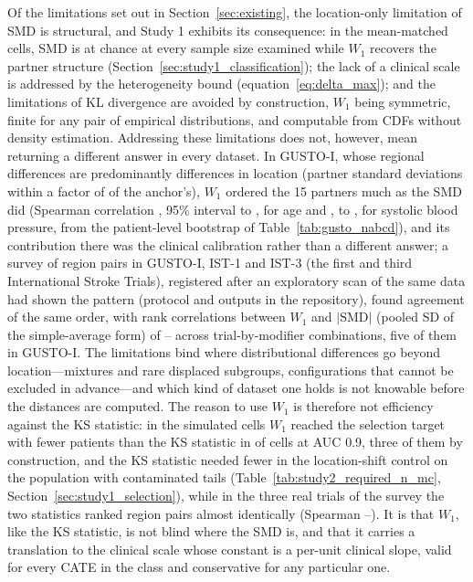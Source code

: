 \documentclass[AMA,Times1COL]{WileyNJDv5}
\begin{document}
Of the limitations set out in Section~\ref{sec:existing}, the location-only limitation of SMD is structural, and Study 1 exhibits its consequence: in the mean-matched cells, SMD is at chance at every sample size examined while $W_1$ recovers the partner structure (Section~\ref{sec:study1_classification}); the lack of a clinical scale is addressed by the heterogeneity bound (equation~\ref{eq:delta_max}); and the limitations of KL divergence are avoided by construction, $W_1$ being symmetric, finite for any pair of empirical distributions, and computable from CDFs without density estimation. Addressing these limitations does not, however, mean returning a different answer in every dataset. In GUSTO-I, whose regional differences are predominantly differences in location (partner standard deviations within a factor of  of the anchor's), $W_1$ ordered the 15 partners much as the SMD did (Spearman correlation , 95\% interval  to , for age and ,  to , for systolic blood pressure, from the patient-level bootstrap of Table~\ref{tab:gusto_nabcd}), and its contribution there was the clinical calibration rather than a different answer; a survey of  region pairs in GUSTO-I, IST-1 and IST-3 (the first and third International Stroke Trials),\cite{gusto1993,ist1_2000,ist3_2012} registered after an exploratory scan of the same data had shown the pattern (protocol and outputs in the repository), found agreement of the same order, with rank correlations between $W_1$ and $|\mathrm{SMD}|$ (pooled SD of the simple-average form) of -- across  trial-by-modifier combinations, five of them in GUSTO-I. The limitations bind where distributional differences go beyond location---mixtures and rare displaced subgroups, configurations that cannot be excluded in advance---and which kind of dataset one holds is not knowable before the distances are computed. The reason to use $W_1$ is therefore not efficiency against the KS statistic: in the simulated cells $W_1$ reached the selection target with fewer patients than the KS statistic in  of  cells at AUC 0.9, three of them by construction, and the KS statistic needed fewer in the location-shift control on the population with contaminated tails (Table~\ref{tab:study2_required_n_mc}, Section~\ref{sec:study1_selection}), while in the three real trials of the survey the two statistics ranked region pairs almost identically (Spearman --). It is that $W_1$, like the KS statistic, is not blind where the SMD is, and that it carries a translation to the clinical scale whose constant is a per-unit clinical slope, valid for every CATE in the class and conservative for any particular one.
\end{document}
